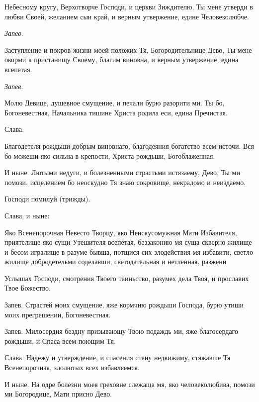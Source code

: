 

Небесному кругу, Верхотворче Господи, и церкви Зиждителю, Ты мене утверди в любви Своей, желанием сыи край, и верным утвержение,  едине Человеколюбче.


\itshape Запев.\normalfont{}


Заступление и покров жизни моей положих Тя, Богородительнице Дево, Ты мене окорми  к пристанищу Своему, благим виновна, и верным утвержение, едина всепетая.


\itshape Запев.\normalfont{}


Молю Девице, душевное смущение, и печали бурю разорити ми. Ты бо, Богоневестная, Начальника тишине Христа родила еси, едина Пречистая.


Слава.


Благодетеля рождьши добрым виновнаго, благодеяния богатство всем источи. Вся бо можеши яко сильна в крепости, Христа рождьши, Богоблаженная.

И ныне. Лютыми недуги, и болезненными страстьми истязаему, Дево, Ты ми помози, исцелением бо неоскудно Тя знаю сокровище, некрадомо и неиздаемо.

Господи помилуй (трижды). 

Слава, и ныне:




Яко Всенепорочная Невесто Творцу, яко Неискусомужная Мати Избавителя, приятелище яко сущи Утешителя всепетая, беззаконию мя суща скверно жилище и бесом игралище в разуме бывша, потщися сих злодействия мя избавити, светло жилище добродетельми соделавши, светодательная и нетленная, разжени




Услышах Господи, смотрения Твоего таиньство, разумех дела Твоя, и прославих Твое Божество.

Запев. Страстей моих смущение, яже кормчию  рождьши Господа, бурю утиши моих прегрешении, Богоневестная.

Запев. Милосердия бездну призывающу Твою подаждь ми, яже благосердаго рождьши, и Спаса всем поющим Тя.

Слава. Надежу и утверждение, и спасения стену недвижиму, стяжавше Тя Всенепорочная, злолютых всех избавляемся.

И ныне. На одре болезни моея греховне слежаща мя, яко человеколюбива, помози ми Богородице, Мати присно Дево.




